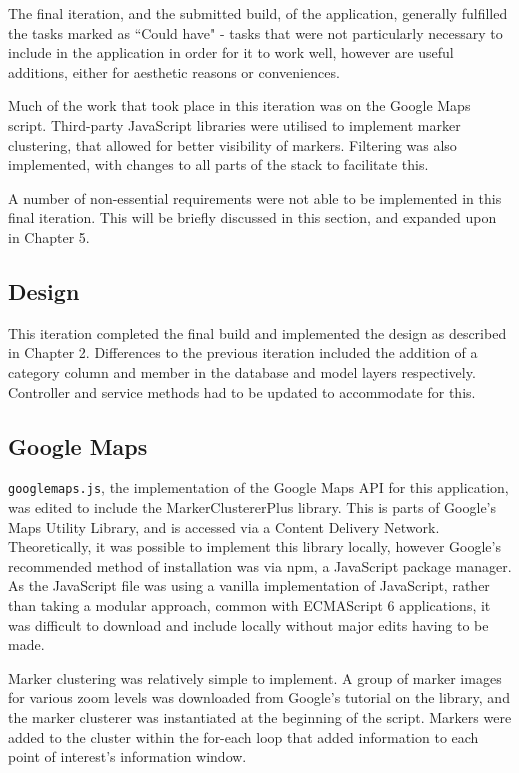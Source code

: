 The final iteration, and the submitted build, of the application, generally fulfilled the tasks marked as ``Could have" - tasks that were not particularly necessary to include in the application in order for it to work well, however are useful additions, either for aesthetic reasons or conveniences.

Much of the work that took place in this iteration was on the Google Maps script. Third-party JavaScript libraries were utilised to implement marker clustering, that allowed for better visibility of markers. Filtering was also implemented, with changes to all parts of the stack to facilitate this.

A number of non-essential requirements were not able to be implemented in this final iteration. This will be briefly discussed in this section, and expanded upon in Chapter 5.

\subsection{Design}

This iteration completed the final build and implemented the design as described in Chapter 2. Differences to the previous iteration included the addition of a category column and member in the database and model layers respectively. Controller and service methods had to be updated to accommodate for this.

\subsection{Google Maps}

\texttt{googlemaps.js}, the implementation of the Google Maps API for this application, was edited to include the MarkerClustererPlus library. This is parts of Google's Maps Utility Library, and is accessed via a Content Delivery Network. Theoretically, it was possible to implement this library locally, however Google's recommended method of installation was via npm, a JavaScript package manager. As the JavaScript file was using a vanilla implementation of JavaScript, rather than taking a modular approach, common with ECMAScript 6 applications, it was difficult to download and include locally without major edits having to be made.

Marker clustering was relatively simple to implement. A group of marker images for various zoom levels was downloaded from Google's tutorial on the library, and the marker clusterer was instantiated at the beginning of the script. Markers were added to the cluster within the for-each loop that added information to each point of interest's information window.

